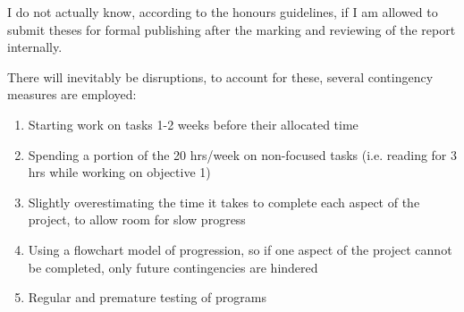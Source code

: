 I do not actually know, according to the honours guidelines, if I am allowed to submit theses for formal publishing after the marking and reviewing of the report internally.

There will inevitably be disruptions, to account for these, several contingency measures are employed:
\begin{enumerate}
\item Starting work on tasks 1-2 weeks before their allocated time
\item Spending a portion of the 20 hrs/week on non-focused tasks (i.e. reading for 3 hrs while working on objective 1)
\item Slightly overestimating the time it takes to complete each aspect of the project, to allow room for slow progress
\item Using a flowchart model of progression, so if one aspect of the project cannot be completed, only future contingencies are hindered
\item Regular and premature testing of programs
\end{enumerate}

